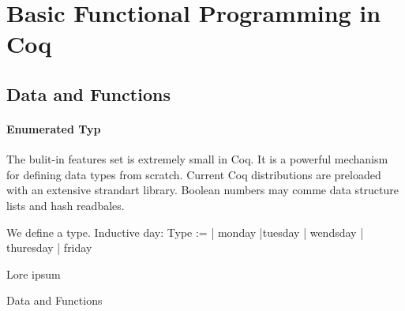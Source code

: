 
\section{Basic Functional Programming in Coq}

\subsection{Data and Functions}
 \paragraph{Enumerated Typ}
  The bulit-in features set is extremely small in Coq. It is a powerful mechanism for defining data types from scratch. Current Coq distributions are preloaded with an extensive strandart library. Boolean numbers may comme data structure lists and hash readbales. 
  \begin{example}
  We define a type.
  Inductive day: Type :=
  | monday
  |tuesday
  | wendsday
  | thuresday
  | friday
  \end{example}

Lore ipsum \cite{PideAmCaGaGrHrSjYo}


Data and Functions



%
